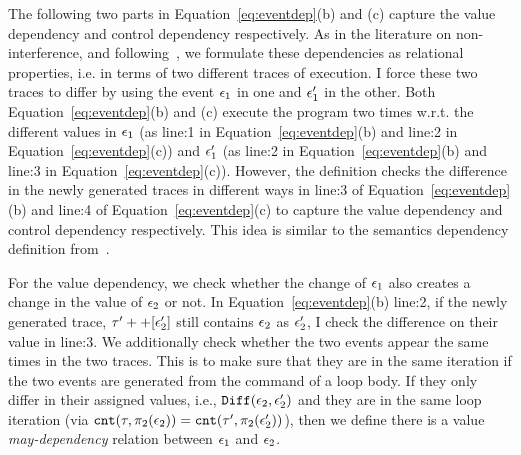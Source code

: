 The following two parts in Equation~\ref{eq:eventdep}(b) and (c) capture the value dependency and control dependency respectively. 
As in the literature on non-interference, and following~\cite{Cousot19a}, we formulate these dependencies as relational properties, i.e. in terms of two different traces of execution. 
I force these two traces to differ by using the event $\mathtt{\epsilon}_1$ in one and $\mathtt{\epsilon}_1'$ in the other. 
Both Equation~\ref{eq:eventdep}(b) and (c) execute the program two times w.r.t. the different values in $\mathtt{\epsilon}_1$ (as line:1 in Equation~\ref{eq:eventdep}(b) and line:2 in Equation~\ref{eq:eventdep}(c))
and $\mathtt{\epsilon}_1'$ (as line:2 in Equation~\ref{eq:eventdep}(b) and line:3 in Equation~\ref{eq:eventdep}(c)).
However, the definition checks the difference in the newly generated traces in different ways in line:3 of Equation~\ref{eq:eventdep}(b) and line:4 of Equation~\ref{eq:eventdep}(c) to capture the value dependency and control dependency respectively.
This idea is similar to the semantics dependency definition from~\cite{Cousot19a}.

For the value dependency, we check whether the change of $\mathtt{\epsilon}_1$ also creates a change in the value of $\mathtt{\epsilon}_2$ or not.
In Equation~\ref{eq:eventdep}(b) line:2, if the newly generated trace, $\mathtt{\tau}' ++ [\mathtt{\epsilon}_2']$ still contains $\mathtt{\epsilon}_2$ as $\mathtt{\epsilon}_2'$, I check the difference on their value in line:3.
We additionally check whether the two events appear the same times in the two traces.
This is to make sure that they are in the same iteration if the two events are generated from the command of a loop body.
If they only differ in their assigned values, i.e., $\mathtt{Diff}(\mathtt{\epsilon}_2, \mathtt{\epsilon}_2')$ and
they are in the same loop iteration (via $\mathtt{cnt}(\mathtt{\tau}, \pi_2(\mathtt{\epsilon}_2)) = \mathtt{cnt}(\mathtt{\tau}', \pi_2(\mathtt{\epsilon}_2'))$),
then we define there is a value \emph{may-dependency} relation between $\mathtt{\epsilon}_1$ and $\mathtt{\epsilon}_2$.

